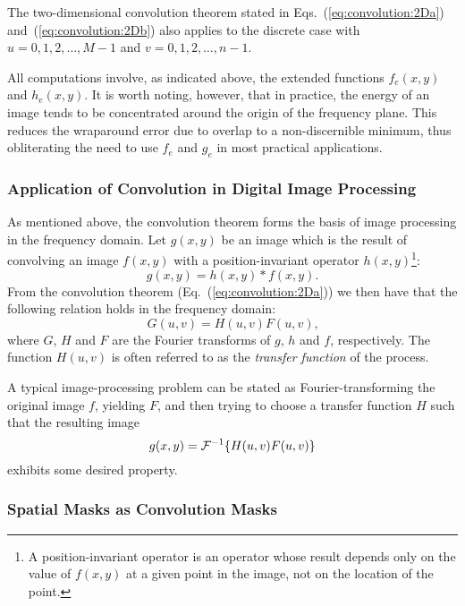 The two-dimensional convolution theorem stated in
Eqs.~(\ref{eq:convolution:2Da}) and~(\ref{eq:convolution:2Db}) also
applies to the discrete case with $u=0,1,2,\ldots,M-1$ and
$v=0,1,2,\ldots,n-1$.  

All computations involve, as indicated above, the extended functions
$f_{e}(x,y)$ and $h_{e}(x,y)$.  It is worth noting, however, that in
practice, the energy of an image tends to be concentrated around the
origin of the frequency plane.  This reduces the wraparound error due
to overlap to a non-discernible minimum, thus obliterating the need to
use $f_{e}$ and $g_{e}$ in most practical applications.

\subsubsection{Application of Convolution in Digital Image Processing}

As mentioned above, the convolution theorem forms the basis of image
processing in the frequency domain.  Let $g(x,y)$ be an image which is
the result of convolving an image $f(x,y)$ with a position-invariant
operator $h(x,y)$\footnote{A position-invariant operator is an
  operator whose result depends only on the value of $f(x,y)$ at a
  given point in the image, not on the location of the point.}:
\begin{equation}
\label{eq:convolution:operator}
  g(x,y)=h(x,y)\ast f(x,y)\mbox{.}
\end{equation}
From the convolution theorem (Eq.~(\ref{eq:convolution:2Da})) we then
have that the following relation holds in the frequency domain:
\begin{equation}
  G(u,v)=H(u,v)F(u,v)\mbox{,}
\end{equation}
where $G$, $H$ and $F$ are the Fourier transforms of $g$, $h$ and $f$,
respectively.  The function $H(u,v)$ is often referred to as the {\em
  transfer function\/} of the process.

A typical image-processing problem can be stated as
Fourier-transforming the original image $f$, yielding $F$, and then
trying to choose a transfer function $H$ such that the resulting image
\begin{equation}
  g(x,y)={\cal F}^{-1}\{H(u,v)F(u,v)\}
\end{equation}
exhibits some desired property.

\subsubsection{Spatial Masks as Convolution Masks}
\label{pg:convolutionmasks}

